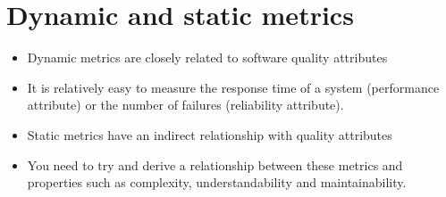 \section {Dynamic and static metrics}
\begin{itemize}

\item Dynamic metrics are closely related to software quality attributes

  \item It is relatively easy to measure the response time of a system (performance attribute) or the number of failures (reliability attribute).

\item Static metrics have an indirect relationship with quality attributes

  \item You need to try and derive a relationship between these metrics and properties such as complexity, understandability and maintainability.
\end{itemize}

\newpage
